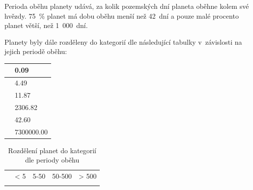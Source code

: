 \documentclass[a4paper,12pt]{article}
\begin{document}
\setlength{\columnsep}{0.43\textwidth}
\begin{multicols}{2}
\begin{minipage}{0.7\textwidth}
Perioda oběhu planety udává, za kolik pozemských dní planeta oběhne kolem své hvězdy. 75~\% planet má dobu oběhu menší než 42~dní a pouze malé procento planet větší, než 1~000~dní.

Planety byly dále rozděleny do kategorií dle následující tabulky v~závislosti na jejich periodě oběhu:

\end{minipage}

\begin{minipage}{0.3\textwidth}
\begin{tabular}{| l| l|}
   \hline
{\cellcolor[rgb]{0.85, 0.85, 0.85}{ Min }} & 0.09 \\ 
   \hline
{\cellcolor[rgb]{0.85, 0.85, 0.85}{ Qu1 }} & 4.49 \\ 
   \hline
{\cellcolor[rgb]{0.85, 0.85, 0.85}{ Median }} & 11.87 \\ 
   \hline
{\cellcolor[rgb]{0.85, 0.85, 0.85}{ Mean }} & 2306.82 \\ 
   \hline
{\cellcolor[rgb]{0.85, 0.85, 0.85}{ Qu3 }} & 42.60 \\ 
   \hline
{\cellcolor[rgb]{0.85, 0.85, 0.85}{ Max }} & 7300000.00 \\ 
   \hline
\end{tabular}\end{minipage}
\end{multicols}

\begin{table}[ht]
\centering
\begin{tabular}{| l| l| l| l| l|}
  \hline
 & {\cellcolor[rgb]{0.85, 0.85, 0.85}{ Lava }} & {\cellcolor[rgb]{0.85, 0.85, 0.85}{ Hot }} & {\cellcolor[rgb]{0.85, 0.85, 0.85}{ Normal }} & {\cellcolor[rgb]{0.85, 0.85, 0.85}{ Cold }} \\ 
  \hline
{\cellcolor[rgb]{0.85, 0.85, 0.85}{ Doba oběhu [dny] }} & < 5 & 5-50 & 50-500 & > 500 \\ 
   \hline
{\cellcolor[rgb]{0.85, 0.85, 0.85}{ Počet }} & {\cellcolor[rgb]{ 0.434627170582227 ,  1 ,  0.434627170582227 }{ 1107 }} & {\cellcolor[rgb]{ 0 ,  1 ,  0 }{ 1958 }} & {\cellcolor[rgb]{ 0.724208375893769 ,  1 ,  0.724208375893769 }{ 540 }} & {\cellcolor[rgb]{ 0.805413687436159 ,  1 ,  0.805413687436159 }{ 381 }} \\ 
   \hline
\end{tabular}
\caption{Rozdělení planet do kategorií dle periody oběhu} 
\end{table}
\newpage  
\end{document}
